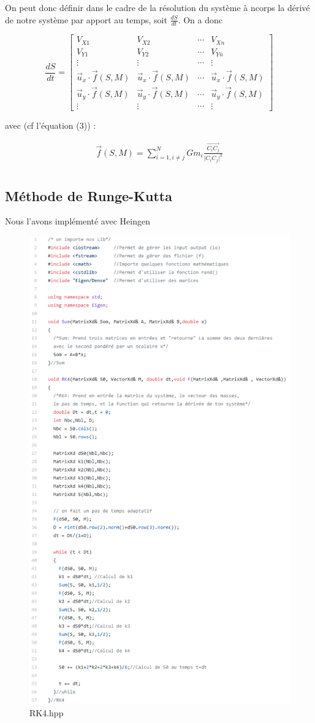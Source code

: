 \documentclass[a4paper]{article}
\begin{document}
On peut donc définir dans le cadre de la résolution du système à ncorps la dérivé de notre système par apport au temps, soit $\frac{dS}{dt}$. On a donc

$$\frac{dS}{dt} = \left[\begin{matrix}
    V_{X1} & V_{X2} & \cdots & V_{Xn}\\
    V_{Y1} & V_{Y2} & \cdots & V_{Yn}\\
    \vdots & \vdots &\cdots & \vdots\\
    \vec{u}_x \cdot \vec{f}(S,M) & \vec{u}_x \cdot \vec{f}(S,M) & \cdots & \vec{u}_x \cdot \vec{f}(S,M)\\
    \vec{u}_y \cdot \vec{f}(S,M) & \vec{u}_y \cdot \vec{f}(S,M) & \cdots & \vec{u}_y \cdot \vec{f}(S,M)\\
    \vdots & \vdots &\cdots & \vdots
\end{matrix}\right]$$

avec (cf l'équation (3)) :

\begin{eqnarray*}
   \vec{f}(S,M) = \sum_{i=1,i \ne j}^{N} Gm_{i}\frac{\overrightarrow{C_{i}C_{j}}}{{|C_{i}C_{j}}|^3} \\
\end{eqnarray*}
\newpage
\subsection{Méthode de Runge-Kutta}

Nous l'avons implémenté avec Heingen

\begin{figure}[h]
\centering
\includegraphics[width=.63\textwidth]{RK4.png}
\caption{RK4.hpp \label{fig:code}}
\end{figure}
\end{document}
